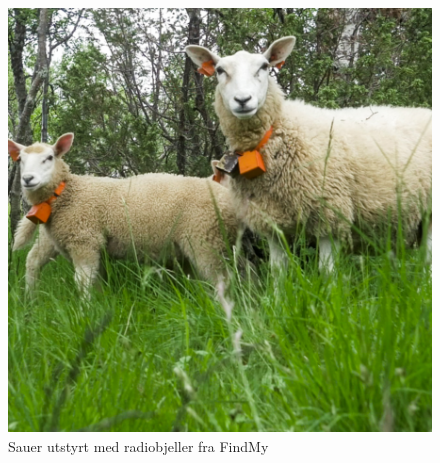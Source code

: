  \begin{figure}[H]
\centering
\captionsetup{width=.8\linewidth}
\includegraphics[scale=0.3]{Figurer/Bilder/findmy_bjeller.png}
\caption{Sauer utstyrt med radiobjeller fra FindMy}
\label{fig:radiobjeller}
\end{figure}
 
